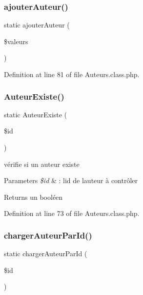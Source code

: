 \subsubsection{\texorpdfstring{ajouter\+Auteur()}{ajouterAuteur()}}
{\footnotesize\ttfamily static ajouter\+Auteur (\begin{DoxyParamCaption}\item[{}]{\$valeurs }\end{DoxyParamCaption})\hspace{0.3cm}{\ttfamily [static]}}



Definition at line 81 of file Auteurs.\+class.\+php.

\mbox{\label{class_auteurs_ab06d5f0fe343a9d54632aab5086bc67d}} 
\subsubsection{\texorpdfstring{Auteur\+Existe()}{AuteurExiste()}}
{\footnotesize\ttfamily static Auteur\+Existe (\begin{DoxyParamCaption}\item[{}]{\$id }\end{DoxyParamCaption})\hspace{0.3cm}{\ttfamily [static]}}

vérifie si un auteur existe 
\begin{DoxyParams}{Parameters}
{\em \$id} & \+: l\textquotesingle{}id de l\textquotesingle{}auteur à contrôler \\
\hline
\end{DoxyParams}
\begin{DoxyReturn}{Returns}
un booléen 
\end{DoxyReturn}


Definition at line 73 of file Auteurs.\+class.\+php.

\mbox{\label{class_auteurs_a3180877cbada17e6cd00e5e043e2b189}} 
\subsubsection{\texorpdfstring{charger\+Auteur\+Par\+Id()}{chargerAuteurParId()}}
{\footnotesize\ttfamily static charger\+Auteur\+Par\+Id (\begin{DoxyParamCaption}\item[{}]{\$id }\end{DoxyParamCaption})\hspace{0.3cm}{\ttfamily [static]}}

